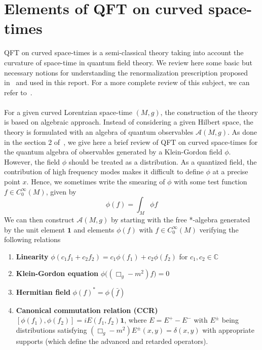 \chapter{Elements of QFT on curved space-times}\label{appendix-qftcst}
QFT on curved space-times is a semi-classical theory taking into account the curvature of space-time in quantum field theory.
We review here some basic but necessary notions for understanding the renormalization prescription proposed in~\cite{Zahn2015} and used in this report.
For a more complete review of this subject, we can refer to~\cite{Hollands2014}. \\\\
%
For a given curved Lorentzian space-time $(M,g)$,
the construction of the theory is based on algebraic approach.
Instead of considering a given Hilbert space, 
the theory is formulated with an algebra of quantum observables $\mathscr{A}(M,g)$.
As done in the section 2 of~\cite{Hollands2014}, we give here a brief review of QFT on curved space-times for the quantum algebra of observables generated by a Klein-Gordon field $\phi$. 
However, the field $\phi$ should be treated as a distribution.
As a quantized field, the contribution of high frequency modes makes it difficult to define $\phi$ at a precise point $x$.
Hence, we sometimes write the smearing of $\phi$ with some test function $f\in C^\infty_0(M)$, given by
\begin{equation*}
\phi(f) = \int_M \phi f
\end{equation*}
We can then construct $\mathscr{A}(M,g)$ by starting with the free *-algebra generated by the unit element $\mathbf{1}$ and elements $\phi(f)$ with $f\in C^\infty_0(M)$ verifying the following relations \\
\begin{enumerate}
\item \textbf{Linearity} $\phi(c_1 f_1 + c_2 f_2) = c_1 \phi(f_1) + c_2 \phi(f_2)$ for $c_1, c_2 \in \mathbb{C}$
%
\item \textbf{Klein-Gordon equation} $\phi\big( (\Box_g - m^2)f \big) = 0$
%
\item \textbf{Hermitian field} $\phi(f)^* = \phi(\bar{f})$
%
\item \textbf{Canonical commutation relation (CCR)} $[\phi(f_1), \phi(f_2)] = iE(f_1, f_2) \mathbf{1}$, where $E = E^+ - E^-$ with $E^\pm$ being distributions satisfying $(\Box_g - m^2)E^\pm(x,y) = \delta(x,y)$ with appropriate supports (which define the advanced and retarded operators).
\end{enumerate}
%
